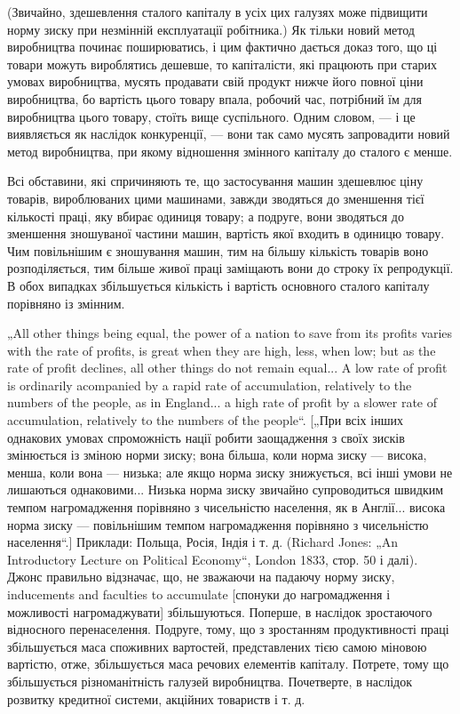 \parcont{}  %
(Звичайно, здешевлення сталого капіталу в усіх цих галузях
може підвищити норму зиску при незмінній експлуатації робітника.)
Як тільки новий метод виробництва починає поширюватись,
і цим фактично дається доказ того, що ці товари можуть
вироблятись дешевше, то капіталісти, які працюють при старих
умовах виробництва, мусять продавати свій продукт нижче
його повної ціни виробництва, бо вартість цього товару впала,
робочий час, потрібний їм для виробництва цього товару, стоїть
вище суспільного. Одним словом, — і це виявляється як наслідок
конкуренції, — вони так само мусять запровадити новий метод
виробництва, при якому відношення змінного капіталу до
сталого є менше.

Всі обставини, які спричиняють те, що застосування машин
здешевлює ціну товарів, вироблюваних цими машинами,
завжди зводяться до зменшення тієї кількості праці, яку вбирає
одиниця товару; а подруге, вони зводяться до зменшення
зношуваної частини машин, вартість якої входить в одиницю
товару. Чим повільнішим є зношування машин, тим на більшу
кількість товарів воно розподіляється, тим більше живої праці
заміщають вони до строку їх репродукції. В обох випадках
збільшується кількість і вартість основного сталого капіталу
порівняно із змінним.

„All other things being equal, the power of a nation to save from
its profits varies with the rate of profits, is great when they are high,
less, when low; but as the rate of profit declines, all other things do
not remain equal... A low rate of profit is ordinarily acompanied by
a rapid rate of accumulation, relatively to the numbers of the people,
as in England... a high rate of profit by a slower rate of accumulation,
relatively to the numbers of the people“. [„При всіх інших
однакових умовах спроможність нації робити заощадження з своїх
зисків змінюється із зміною норми зиску; вона більша, коли
норма зиску — висока, менша, коли вона — низька; але якщо
норма зиску знижується, всі інші умови не лишаються однаковими...
Низька норма зиску звичайно супроводиться швидким
темпом нагромадження порівняно з чисельністю населення,
як в Англії... висока норма зиску — повільнішим темпом нагромадження
порівняно з чисельністю населення“.] Приклади: Польща,
Росія, Індія і т. д. (Richard Jones: „An Introductory Lecture on Political
Economy“, London 1833, стор. 50 і далі). Джонс правильно відзначає,
що, не зважаючи на падаючу норму зиску, inducements
and faculties to accumulate [спонуки до нагромадження і можливості
нагромаджувати] збільшуються. Поперше, в наслідок зростаючого
відносного перенаселення. Подруге, тому, що з зростанням
продуктивності праці збільшується маса споживних вартостей,
представлених тією самою міновою вартістю, отже, збільшується
маса речових елементів капіталу. Потрете, тому що
збільшується різноманітність галузей виробництва. Почетверте,
в наслідок розвитку кредитної системи, акційних товариств і т. д.
\parbreak{}  %
